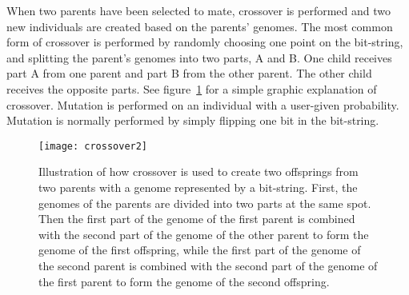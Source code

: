 When two parents have been selected to mate, crossover is performed and two new individuals are created based on the parents' genomes. The most common form of crossover is performed by randomly choosing one point on the bit-string, and splitting the parent's genomes into two parts, A and B. One child receives part A from one parent and part B from the other parent. The other child receives the opposite parts. See figure~\ref{fig:Crossover} for a simple graphic explanation of crossover. Mutation is performed on an individual with a user-given probability. Mutation is normally performed by simply flipping one bit in the bit-string.

\begin{figure}[htbp]
    \centering
    \texttt{[image: crossover2]}
    \caption[Illustration of how crossover is used to create two offsprings from two parents with a genome represented by a bit-string.]{Illustration of how crossover is used to create two offsprings from two parents with a genome represented by a bit-string. First, the genomes of the parents are divided into two parts at the same spot. Then the first part of the genome of the first parent is combined with the second part of the genome of the other parent to form the genome of the first offspring, while the first part of the genome of the second parent is combined with the second part of the genome of the first parent to form the genome of the second offspring.}
    \label{fig:Crossover}
\end{figure}
 
